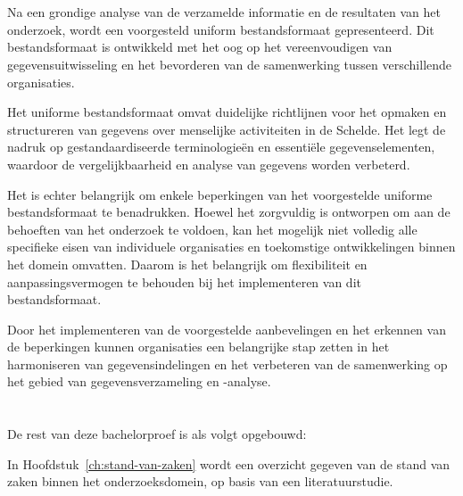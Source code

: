 \section{}%
\label{sec:Aanbevelingen-beperkingen}

Na een grondige analyse van de verzamelde informatie en de resultaten van het onderzoek, wordt een voorgesteld uniform bestandsformaat gepresenteerd. Dit bestandsformaat is ontwikkeld met het oog op het vereenvoudigen van gegevensuitwisseling en het bevorderen van de samenwerking tussen verschillende organisaties.

Het uniforme bestandsformaat omvat duidelijke richtlijnen voor het opmaken en structureren van gegevens over menselijke activiteiten in de Schelde. Het legt de nadruk op gestandaardiseerde terminologieën en essentiële gegevenselementen, waardoor de vergelijkbaarheid en analyse van gegevens worden verbeterd.

Het is echter belangrijk om enkele beperkingen van het voorgestelde uniforme bestandsformaat te benadrukken. Hoewel het zorgvuldig is ontworpen om aan de behoeften van het onderzoek te voldoen, kan het mogelijk niet volledig alle specifieke eisen van individuele organisaties en toekomstige ontwikkelingen binnen het domein omvatten. Daarom is het belangrijk om flexibiliteit en aanpassingsvermogen te behouden bij het implementeren van dit bestandsformaat.

Door het implementeren van de voorgestelde aanbevelingen en het erkennen van de beperkingen kunnen organisaties een belangrijke stap zetten in het harmoniseren van gegevensindelingen en het verbeteren van de samenwerking op het gebied van gegevensverzameling en -analyse.

\section{}%
\label{sec:opzet-bachelorproef}


De rest van deze bachelorproef is als volgt opgebouwd:

In Hoofdstuk~\ref{ch:stand-van-zaken} wordt een overzicht gegeven van de stand van zaken binnen het onderzoeksdomein, op basis van een literatuurstudie.

